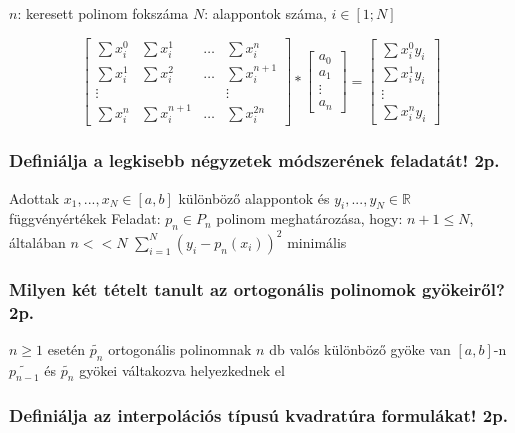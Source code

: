 \documentclass[12pt,a4paper]{article}
\begin{document}
\begin{outline}
	\1 $n$: keresett polinom fokszáma
	\1 $N$: alappontok száma, $i \in [1;N]$
\end{outline}

$$
\begin{bmatrix}
\sum x_i^0 & \sum x_i^1 & \dots & \sum x_i^n \\
\sum x_i^1 & \sum x_i^2 & \dots & \sum x_i^{n+1} \\
\vdots & & & \vdots \\
\sum x_i^n & \sum x_i^{n+1} & \dots & \sum x_i^{2n}
\end{bmatrix}
*
\begin{bmatrix} a_0 \\ a_1 \\ \vdots \\ a_n \end{bmatrix}
=
\begin{bmatrix} \sum x_i^0 y_i \\ \sum x_i^1 y_i \\ \vdots \\ \sum x_i^n y_i \end{bmatrix}
$$

\subsubsection{Definiálja a legkisebb négyzetek módszerének feladatát! 2p.}

\begin{outline}
	\1 Adottak $x_1,...,x_N \in [a,b]$ különböző alappontok
	és $y_i,...,y_N \in \mathbb{R}$ függvényértékek
	\1 Feladat: $p_n \in P_n$ polinom meghatározása, hogy:
		\2 $n+1 \le N$, általában $n << N$
		\2 $\sum_{i=1}^N (y_i - p_n(x_i))^2$ minimális
\end{outline}

\subsubsection{Milyen két tételt tanult az ortogonális polinomok gyökeiről? 2p.}

\begin{outline}
	\1 $n \ge 1$ esetén $\tilde{p_n}$ ortogonális polinomnak $n$ db valós különböző gyöke van $[a,b]$-n
	\1 $\tilde{p_{n-1}}$ és $\tilde{p_n}$ gyökei váltakozva helyezkednek el
\end{outline}

\subsubsection{Definiálja az interpolációs típusú kvadratúra formulákat! 2p.}
\end{document}
